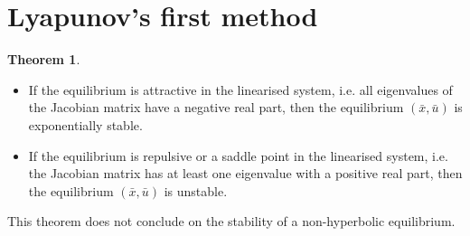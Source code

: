 \documentclass[12pt, openany]{report}
\theoremstyle{definition}
\newtheorem{thm}{Theorem}[chapter]
\begin{document}
\section{Lyapunov's first method}
\begin{thm}
    \begin{itemize}
        \item If the equilibrium is attractive in the linearised system, i.e. all eigenvalues of the Jacobian matrix have a negative real part, then the equilibrium \((\bar x,\bar u)\) is exponentially stable.
        \item If the equilibrium is repulsive or a saddle point in the linearised system, i.e. the Jacobian matrix has at least one eigenvalue with a positive real part, then the equilibrium \((\bar x,\bar u)\) is unstable. 
    \end{itemize}
\end{thm}
This theorem does not conclude on the stability of a non-hyperbolic equilibrium. 
\end{document}
